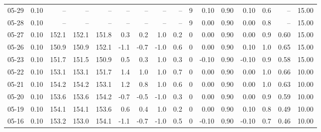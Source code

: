 \begin{threeparttable}
{\begin{tabular}{lrrrrrrrrrrrrrrr}
  05-29 &     0.10 &    -- &    -- &    -- &         -- &             -- &                       -- &                  -- &              9 &       0.10 &      0.90 &           0.10 &              0.6 &              -- &                  15.00 \\
  05-28 &     0.10 &    -- &    -- &    -- &         -- &             -- &                       -- &                  -- &              9 &       0.00 &      0.90 &           0.00 &              0.8 &              -- &                  15.00 \\
  05-27 &     0.10 & 152.1 & 152.1 & 151.8 &        0.3 &            0.2 &                      1.0 &                 0.2 &              0 &       0.00 &      0.90 &           0.00 &              0.9 &            0.60 &                  15.00 \\
  05-26 &     0.10 & 150.9 & 150.9 & 152.1 &       -1.1 &           -0.7 &                     -1.0 &                 0.6 &              0 &       0.00 &      0.90 &           0.10 &              1.0 &            0.65 &                  15.00 \\
  05-23 &     0.10 & 151.7 & 151.5 & 150.9 &        0.5 &            0.3 &                      1.0 &                 0.3 &              0 &      -0.10 &      0.90 &          -0.10 &              0.9 &            0.58 &                  15.00 \\
  05-22 &     0.10 & 153.1 & 153.1 & 151.7 &        1.4 &            1.0 &                      1.0 &                 0.7 &              0 &       0.00 &      0.90 &           0.00 &              1.0 &            0.66 &                  10.00 \\
  05-21 &     0.10 & 154.2 & 154.2 & 153.1 &        1.2 &            0.8 &                      1.0 &                 0.6 &              0 &       0.00 &      0.90 &           0.00 &              1.0 &            0.63 &                  10.00 \\
  05-20 &     0.10 & 153.6 & 153.6 & 154.2 &       -0.7 &           -0.5 &                     -1.0 &                 0.3 &              0 &       0.00 &      0.90 &           0.00 &              0.9 &            0.59 &                  10.00 \\
  05-19 &     0.10 & 154.1 & 154.1 & 153.6 &        0.6 &            0.4 &                      1.0 &                 0.2 &              0 &       0.00 &      0.90 &           0.10 &              0.8 &            0.49 &                  10.00 \\
  05-16 &     0.10 & 153.2 & 153.0 & 154.1 &       -1.1 &           -0.7 &                     -1.0 &                 0.5 &              0 &      -0.10 &      0.90 &          -0.10 &              0.7 &            0.46 &                  10.00 \\

\end{tabular}}
\end{threeparttable}
